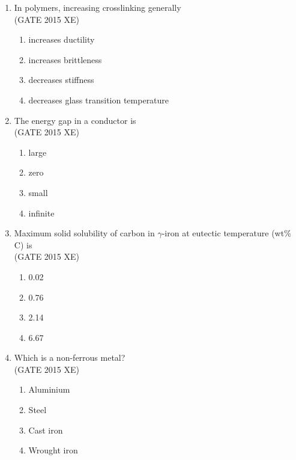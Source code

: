 \documentclass[journal,12pt,onecolumn]{IEEEtran}
\begin{document}
\begin{enumerate}
\item In polymers, increasing crosslinking generally  \\
\hfill{(GATE 2015 XE)} 
\begin{multicols}{2}
\begin{enumerate}
\item increases ductility
\item increases brittleness
\item decreases stiffness
\item decreases glass transition temperature
\end{enumerate}
\end{multicols}

\item The energy gap in a conductor is  \\
\hfill{(GATE 2015 XE)} 
\begin{multicols}{4}
\begin{enumerate}
\item large
\item zero
\item small
\item infinite
\end{enumerate}
\end{multicols}

\item Maximum solid solubility of carbon in $\gamma$-iron at eutectic temperature (wt\% C) is  \\
\hfill{(GATE 2015 XE)} 
\begin{multicols}{4}
\begin{enumerate}
\item 0.02
\item 0.76
\item 2.14
\item 6.67
\end{enumerate}
\end{multicols}

\item Which is a non-ferrous metal?  \\
\hfill{(GATE 2015 XE)} 
\begin{multicols}{4}
\begin{enumerate}
\item Aluminium
\item Steel
\item Cast iron
\item Wrought iron
\end{enumerate}
\end{multicols}


\end{enumerate}
\end{document}
